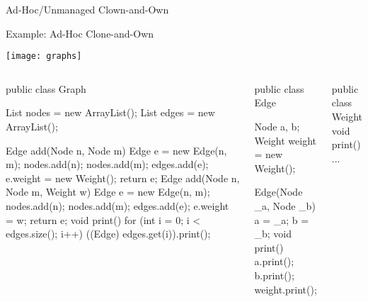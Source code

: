 \begin{frame}{Ad-Hoc/Unmanaged Clown-and-Own}
	\begin{mycolumns}[columns=2,widths={50,50},animation=none]
		\vspace{3mm}		
	\mynextcolumn
	\end{mycolumns}	
\end{frame}

\begin{frame}[fragile]{Example: Ad-Hoc Clone-and-Own}
	\vspace{-1.2cm}
	\begin{flushright}
		\texttt{[image: graphs]}		
	\end{flushright}
	\vspace{0.1cm}
	\begin{tiny}
		\begin{columns}
				\vspace{-15mm}
\vspace{3mm}				
\begin{codetight}{}
public class Graph {
	List nodes = new ArrayList();
	List edges = new ArrayList();

	Edge add(Node n, Node m) {
		Edge e = new Edge(n, m);
		nodes.add(n); nodes.add(m); edges.add(e);
		e.weight = new Weight();
		return e;
	}
	Edge add(Node n, Node m, Weight w) {
		Edge e = new Edge(n, m);
		nodes.add(n); nodes.add(m); edges.add(e);
		e.weight = w;
		return e;
	}
	void print() {
		for (int i = 0; i < edges.size(); i++) {
			((Edge) edges.get(i)).print();
		}
	}
}
\end{codetight}
\begin{codetight}{}
public class Edge {
	Node a, b;
	Weight weight = new Weight();

	Edge(Node _a, Node _b) {
		a = _a; b = _b;
	}
	void print() {
		a.print(); b.print();
		weight.print();
	}
}
\end{codetight}
\begin{codetight}{}
public class Weight {
	void print() {...}
}
\end{codetight}
		\end{columns}
	\end{tiny}
\end{frame}

